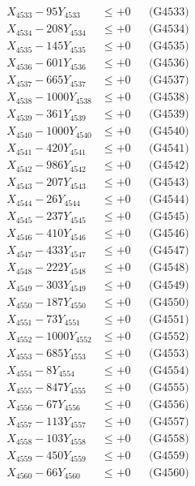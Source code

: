 \documentclass[a4paper,10pt]{article}
\begin{document}
{\begin{align}
X_{4533} - 95Y_{4533} &\leq +0 && \text{(G4533)} \\
X_{4534} - 208Y_{4534} &\leq +0 && \text{(G4534)} \\
X_{4535} - 145Y_{4535} &\leq +0 && \text{(G4535)} \\
X_{4536} - 601Y_{4536} &\leq +0 && \text{(G4536)} \\
X_{4537} - 665Y_{4537} &\leq +0 && \text{(G4537)} \\
X_{4538} - 1000Y_{4538} &\leq +0 && \text{(G4538)} \\
X_{4539} - 361Y_{4539} &\leq +0 && \text{(G4539)} \\
X_{4540} - 1000Y_{4540} &\leq +0 && \text{(G4540)} \\
\allowbreak
X_{4541} - 420Y_{4541} &\leq +0 && \text{(G4541)} \\
X_{4542} - 986Y_{4542} &\leq +0 && \text{(G4542)} \\
X_{4543} - 207Y_{4543} &\leq +0 && \text{(G4543)} \\
X_{4544} - 26Y_{4544} &\leq +0 && \text{(G4544)} \\
X_{4545} - 237Y_{4545} &\leq +0 && \text{(G4545)} \\
X_{4546} - 410Y_{4546} &\leq +0 && \text{(G4546)} \\
X_{4547} - 433Y_{4547} &\leq +0 && \text{(G4547)} \\
X_{4548} - 222Y_{4548} &\leq +0 && \text{(G4548)} \\
X_{4549} - 303Y_{4549} &\leq +0 && \text{(G4549)} \\
X_{4550} - 187Y_{4550} &\leq +0 && \text{(G4550)} \\
\allowbreak
X_{4551} - 73Y_{4551} &\leq +0 && \text{(G4551)} \\
X_{4552} - 1000Y_{4552} &\leq +0 && \text{(G4552)} \\
X_{4553} - 685Y_{4553} &\leq +0 && \text{(G4553)} \\
X_{4554} - 8Y_{4554} &\leq +0 && \text{(G4554)} \\
X_{4555} - 847Y_{4555} &\leq +0 && \text{(G4555)} \\
X_{4556} - 67Y_{4556} &\leq +0 && \text{(G4556)} \\
X_{4557} - 113Y_{4557} &\leq +0 && \text{(G4557)} \\
X_{4558} - 103Y_{4558} &\leq +0 && \text{(G4558)} \\
X_{4559} - 450Y_{4559} &\leq +0 && \text{(G4559)} \\
X_{4560} - 66Y_{4560} &\leq +0 && \text{(G4560)} \\

\end{align}}
\end{document}
